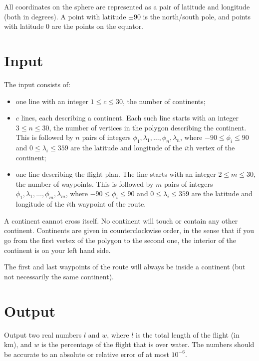 All coordinates on the sphere are represented as a pair of latitude and
longitude (both in degrees).  A point with latitude $\pm 90$ is the
north/south pole, and points with latitude $0$ are the points on the
equator.

\section*{Input}

The input consists of:

\begin{itemize}
\item one line with an integer $1 \le c \le 30$, the number of continents;
\item $c$ lines, each describing a continent. Each such line starts
  with an integer $3 \le n \le 30$, the number of vertices in the
  polygon describing the continent.  This is followed by $n$ pairs of
  integers $\phi_1, \lambda_1, \ldots, \phi_n, \lambda_n$, where $-90
  \le \phi_i \le 90$ and $0 \le \lambda_i \le 359$ are the latitude and
  longitude of the $i$th vertex of the continent;
\item one line describing the flight plan.  The line starts with an
  integer $2 \le m \le 30$, the number of waypoints.  This is followed
  by $m$ pairs of integers $\phi_1, \lambda_1, \ldots, \phi_m,
  \lambda_m$, where $-90 \le \phi_i \le 90$ and $0 \le \lambda_i \le
  359$ are the latitude and longitude of the $i$th waypoint of the
  route.
\end{itemize}

A continent cannot cross itself.  No continent will touch or contain
any other continent.  Continents are given in counterclockwise order,
in the sense that
if you go from the first vertex of the polygon to
the second one, the interior of the continent is on your left hand
side.

The first and last waypoints of the route will always be inside a
continent (but not necessarily the same continent).

\section*{Output}

Output two real numbers $l$ and $w$, where $l$ is
the total length of the flight (in km), and $w$ is the percentage of
the flight that is over water.  The numbers should be accurate to an
absolute or relative error of at most $10^{-6}$.
